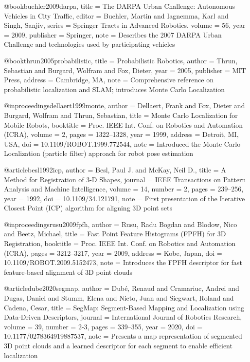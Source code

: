     @book{buehler2009darpa,
  title = {The DARPA Urban Challenge: Autonomous Vehicles in City Traffic},
  editor = {Buehler, Martin and Iagnemma, Karl and Singh, Sanjiv},
  series = {Springer Tracts in Advanced Robotics},
  volume = {56},
  year = {2009},
  publisher = {Springer},
  note = {Describes the 2007 DARPA Urban Challenge and technologies used by participating vehicles}
}

@book{thrun2005probabilistic,
  title = {Probabilistic Robotics},
  author = {Thrun, Sebastian and Burgard, Wolfram and Fox, Dieter},
  year = {2005},
  publisher = {MIT Press},
  address = {Cambridge, MA},
  note = {Comprehensive reference on probabilistic localization and SLAM; introduces Monte Carlo Localization}
}

@inproceedings{dellaert1999monte,
  author = {Dellaert, Frank and Fox, Dieter and Burgard, Wolfram and Thrun, Sebastian},
  title = {Monte Carlo Localization for Mobile Robots},
  booktitle = {Proc. IEEE Int. Conf. on Robotics and Automation (ICRA)},
  volume = {2},
  pages = {1322--1328},
  year = {1999},
  address = {Detroit, MI, USA},
  doi = {10.1109/ROBOT.1999.772544},
  note = {Introduced the Monte Carlo Localization (particle filter) approach for robot pose estimation}
}

@article{besl1992icp,
  author = {Besl, Paul J. and McKay, Neil D.},
  title = {A Method for Registration of 3-D Shapes},
  journal = {IEEE Transactions on Pattern Analysis and Machine Intelligence},
  volume = {14},
  number = {2},
  pages = {239--256},
  year = {1992},
  doi = {10.1109/34.121791},
  note = {First presentation of the Iterative Closest Point (ICP) algorithm for aligning 3D point sets}
}

@inproceedings{rusu2009fpfh,
  author = {Rusu, Radu Bogdan and Blodow, Nico and Beetz, Michael},
  title = {Fast Point Feature Histograms (FPFH) for 3D Registration},
  booktitle = {Proc. IEEE Int. Conf. on Robotics and Automation (ICRA)},
  pages = {3212--3217},
  year = {2009},
  address = {Kobe, Japan},
  doi = {10.1109/ROBOT.2009.5152473},
  note = {Introduces the FPFH descriptor for fast feature-based alignment of 3D point clouds}
}

@article{dube2020segmap,
  author = {Dub{\'e}, Renaud and Cramariuc, Andrei and Dugas, Daniel and Stumm, Elena and Nieto, Juan and Siegwart, Roland and Cadena, Cesar},
  title = {SegMap: Segment-Based Mapping and Localization using Data-Driven Descriptors},
  journal = {International Journal of Robotics Research},
  volume = {39},
  number = {2-3},
  pages = {339--355},
  year = {2020},
  doi = {10.1177/0278364919887537},
  note = {Presents a map representation of segmented 3D point clouds and a learned descriptor for each segment to enable efficient localization}
}

